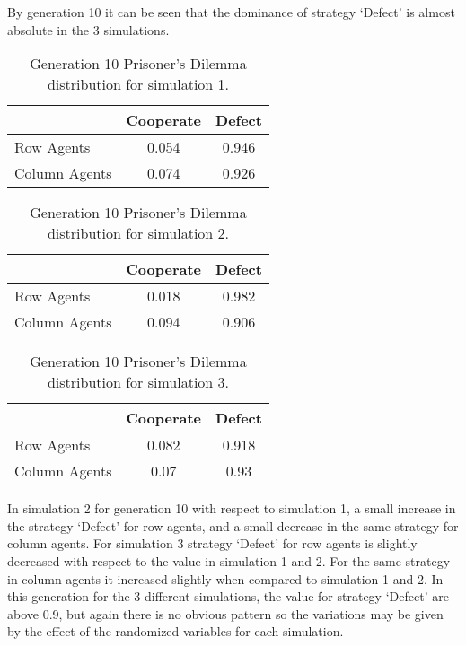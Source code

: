 By generation 10 it can be seen that the dominance of strategy `Defect'  is almost absolute in the 3 simulations.
\begin{table}[H]
\begin{center}
\begin{tabular}{|l|c|c|}
\hline
& Cooperate & Defect \\ 
\hline
Row Agents & 0.054 & 0.946\\
\hline
Column Agents & 0.074 & 0.926\\
\hline
\end{tabular}
\end{center}
\caption{Generation 10 Prisoner’s Dilemma distribution for simulation 1.}
\label{tab:pds1g10}
\end{table}

\begin{table}[H]
\begin{center}
\begin{tabular}{|l|c|c|}
\hline
& Cooperate & Defect \\ 
\hline
Row Agents & 0.018 & 0.982\\
\hline
Column Agents & 0.094 & 0.906\\
\hline
\end{tabular}
\end{center}
\caption{Generation 10 Prisoner’s Dilemma distribution for simulation 2.}
\label{tab:pds2g10}
\end{table}

\begin{table}[H]
\begin{center}
\begin{tabular}{|l|c|c|}
\hline
& Cooperate & Defect \\ 
\hline
Row Agents & 0.082 & 0.918\\
\hline
Column Agents & 0.07 & 0.93\\
\hline
\end{tabular}
\end{center}
\caption{Generation 10 Prisoner’s Dilemma distribution for simulation 3.}
\label{tab:pds3g10}
\end{table}

In simulation 2 for generation 10  with respect to simulation 1, a small increase in the strategy `Defect'  for row agents, and a small decrease in the same strategy for column agents. For simulation 3 strategy `Defect' for row agents is slightly decreased with respect to the value in simulation 1 and 2. For the same strategy in column agents it increased slightly when compared to simulation 1 and 2.
In this generation for the 3 different simulations, the value for strategy `Defect' are above 0.9, but again there is no obvious pattern so the variations may be given by the effect of the randomized variables for each simulation.

